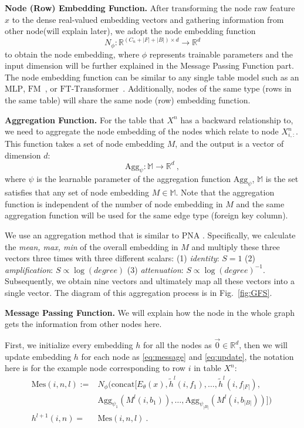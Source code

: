 \header
\textbf{Node (Row) Embedding Function.}
After transforming the node raw feature $x$ to the dense real-valued embedding vectors and gathering information from other node(will explain later), we adopt the node embedding function
\begin{equation}
    N_{\phi}: \mathbb{R}^{(C_n+|F|+|B|)\times d}\rightarrow \mathbb{R}^{d}
\end{equation}
to obtain the node embedding, where 
$\phi$ represents trainable parameters and the input dimension will be 
 further explained in the Message Passing Function part. The node embedding function can be similar to any single table model such as an $\text{MLP}$, $\text{FM}$~\cite{rendle2010factorization}, or $\text{FT-Transformer}$~\cite{gorishniy2021revisiting}. Additionally, nodes of the same type (rows in the same table) will share the same node (row) embedding function.

\header
\textbf{Aggregation Function. }
For the table that $X^{n}$ has a backward relationship to, we need to aggregate the node embedding of the nodes which relate to node $X^{n}_{i,:}$. This function takes a set of node embedding $M$, and the output is a vector of dimension $d$:
\begin{equation}
    \text{Agg}_{\psi}: \mathbb{M}\rightarrow\mathbb{R}^{d}~,
\end{equation}
where $\psi$ is the learnable parameter of the aggregation function $\text{Agg}_{\psi}$, $\mathbb{M}$ is the set satisfies that any set of node embedding $M\in\mathbb{M}$. Note that the aggregation function is independent of the number of node embedding in $M$ and the same aggregation function will be used for the same edge type (foreign key column).

We use an aggregation method that is similar to PNA \cite{corso2020principal}. Specifically, we calculate the \textit{mean, max, min} of the overall embedding in $M$ and multiply these three vectors three times with three different scalars: (1) \textit{identity}: $S=1$ (2) \textit{amplification}: $S\propto \log(degree)$ (3) \textit{attenuation}: $S\propto \log(degree)^{-1}$. Subsequently, we obtain nine vectors and ultimately map all these vectors into a single vector. The diagram of this aggregation process is in Fig.~\ref{fig:GFS}.

\header
\textbf{Message Passing Function.}
We will explain how the node in the whole graph gets the information from other nodes here.

First, we initialize every embedding $h$ for all the nodes as $\Vec{0}\in \mathbb{R}^d$, then we will update embedding $h$ for each node as \eqref{eq:message} and \eqref{eq:update}, the notation here is for the example node corresponding to row $i$ in table $X^n$:
\begin{align}
\text{Mes}(i, n, l):=& N_\phi\big(\text{concat}[E_\theta(x), \tilde{h}^{l}(i, f_1), \ldots , \tilde{h}^{l}(i, f_{|F|}),\label{eq:message}\\
&\text{Agg}_{\psi_1}(M^{l}(i, b_1)), \ldots,\text{Agg}_{\psi_{|B|}}(M^{l}(i, b_{|B|}))]\big)~\nonumber\\
h^{l+1}(i, n) =& \text{Mes}(i, n, l)~. \label{eq:update}
\end{align}

